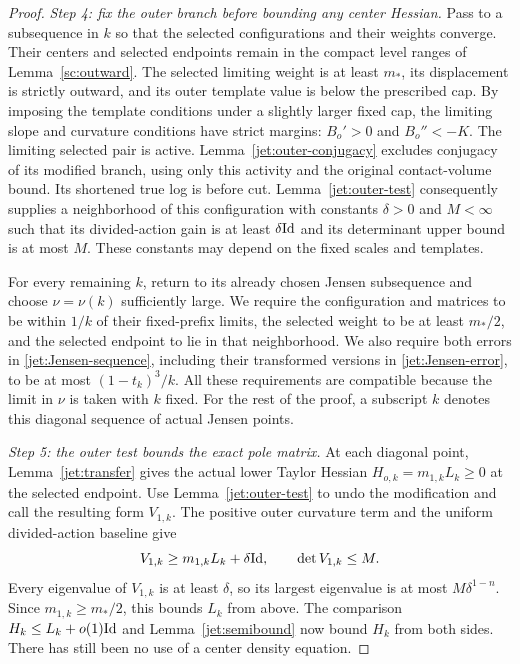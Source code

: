 \begin{proof}
\emph{Step 4: fix the outer branch before bounding any center Hessian.}
Pass to a subsequence in $k$ so that the selected configurations
and their weights converge. Their centers and selected
endpoints remain in the compact level ranges of
Lemma~\ref{sc:outward}. The selected limiting weight is at
least $m_*$, its displacement is strictly outward, and its
outer template value is below the prescribed cap. By imposing
the template conditions under a slightly larger fixed cap,
the limiting slope and curvature conditions have strict
margins:
$B_o'>0$ and $B_o''<-K$. The limiting selected pair is active.
Lemma~\ref{jet:outer-conjugacy} excludes conjugacy of its
modified branch, using only this activity and the original
contact-volume bound. Its shortened true log is before cut.
Lemma~\ref{jet:outer-test} consequently supplies a neighborhood
of this configuration with constants $\delta>0$ and $M<\infty$
such that its divided-action gain is at least $\delta\mathrm{Id}$
and its determinant upper bound is at most $M$.
These constants may depend on the fixed scales and templates.

For every remaining $k$, return to its already chosen
Jensen subsequence and choose $\nu=\nu(k)$ sufficiently large.
We require the configuration and matrices to be within $1/k$
of their fixed-prefix limits, the selected weight to be at
least $m_*/2$, and the selected endpoint to lie in that
neighborhood. We also require both errors in
\eqref{jet:Jensen-sequence}, including their transformed
versions in \eqref{jet:Jensen-error}, to be at most
$(1-t_k)^3/k$. All these requirements are compatible because
the limit in $\nu$ is taken with $k$ fixed.
For the rest of the proof, a subscript $k$ denotes this
diagonal sequence of actual Jensen points.

\emph{Step 5: the outer test bounds the exact pole matrix.}
At each diagonal point, Lemma~\ref{jet:transfer} gives the
actual lower Taylor Hessian
$H_{o,k}=m_{1,k}L_k\ge0$ at the selected endpoint. Use
Lemma~\ref{jet:outer-test} to undo the modification and call
the resulting form $V_{1,k}$. The positive outer curvature
term and the uniform divided-action baseline give
\begin{equation}\label{jet:bootstrap}
 V_{1,k}\ge m_{1,k}L_k+\delta\mathrm{Id},\qquad
 \det V_{1,k}\le M.
\end{equation}
Every eigenvalue of $V_{1,k}$ is at least $\delta$, so its
largest eigenvalue is at most $M\delta^{1-n}$. Since
$m_{1,k}\ge m_*/2$, this bounds $L_k$ from above.
The comparison $H_k\le L_k+o(1)\mathrm{Id}$ and
Lemma~\ref{jet:semibound} now bound $H_k$ from both sides.
There has still been no use of a center density equation.


\end{proof}
